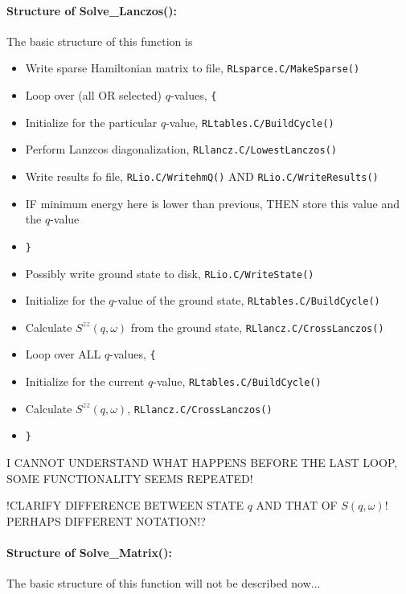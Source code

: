 \documentclass{article}
\begin{document}
\paragraph{Structure of Solve\_Lanczos():} The basic structure of this function is
\begin{itemize}
\item Write sparse Hamiltonian matrix to file, \verb+RLsparce.C/MakeSparse()+
\item Loop over (all OR selected) $q$-values, \verb+{+
\item \hspace{5mm} Initialize for the particular $q$-value, \verb+RLtables.C/BuildCycle()+
\item \hspace{5mm} Perform Lanzcos diagonalization, \verb+RLlancz.C/LowestLanczos()+
\item \hspace{5mm} Write results fo file, \verb+RLio.C/WritehmQ()+ AND \verb+RLio.C/WriteResults()+
\item \hspace{5mm} IF minimum energy here is lower than previous, THEN store this value and the $q$-value
\item \verb+}+
\item Possibly write ground state to disk, \verb+RLio.C/WriteState()+
\item Initialize for the $q$-value of the ground state, \verb+RLtables.C/BuildCycle()+
\item Calculate $S^{zz}(q,\omega)$ from the ground state, \verb+RLlancz.C/CrossLanczos()+
\item Loop over ALL $q$-values, \verb+{+
\item \hspace{5mm} Initialize for the current $q$-value, \verb+RLtables.C/BuildCycle()+
\item \hspace{5mm} Calculate $S^{zz}(q,\omega)$, \verb+RLlancz.C/CrossLanczos()+
\item \verb+}+
\end{itemize}
I CANNOT UNDERSTAND WHAT HAPPENS BEFORE THE LAST LOOP, SOME FUNCTIONALITY SEEMS REPEATED!

!CLARIFY DIFFERENCE BETWEEN STATE $q$ AND THAT OF $S(q,\omega)$! PERHAPS DIFFERENT NOTATION!?

\paragraph{Structure of Solve\_Matrix():} The basic structure of this function will not be described now...
\end{document}
